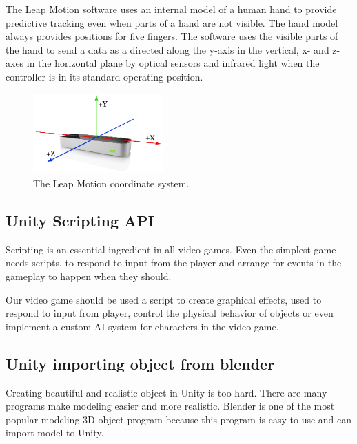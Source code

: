 \documentclass[journal]{IEEEtran}										    %
\begin{document}
                The Leap Motion software uses an internal model of a human hand 
                to provide predictive tracking even when parts of a hand are not 
                visible. The hand model always provides positions for five fingers. 
                The software uses the visible parts of the hand to send a data 
                as a directed along the y-axis in the vertical, x- and z-axes 
                in the horizontal plane by optical sensors and infrared light 
                when the controller is in its standard operating position.

                \begin{figure}[h]
                    \centering
                    \includegraphics[width=5cm]{Leap-Axes}
                    \caption{The Leap Motion coordinate system.}
                    \label{fig:leap1}
                \end{figure}
            
            \subsection{Unity Scripting API}
                Scripting is an essential ingredient in all video games. Even 
                the simplest game needs scripts, to respond to input from 
                the player and arrange for events in the gameplay to happen when 
                they should. 

                Our video game should be used a script to create graphical effects, 
                used to respond to input from player, control the physical behavior 
                of objects or even implement a custom AI system for characters 
                in the video game.
            
            \subsection{Unity importing object from blender}
                Creating beautiful and realistic object in Unity is too hard. 
                There are many programs make modeling easier and more realistic. 
                Blender is one of the most popular modeling 3D object program 
                because this program is easy to use and can import model to Unity.
\end{document}
